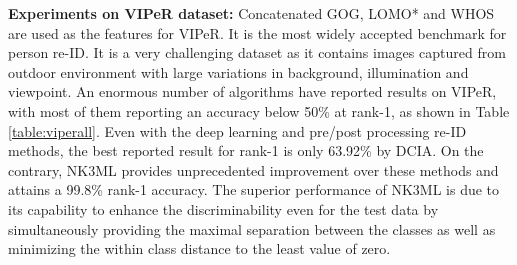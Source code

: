 \documentclass[runningheads]{llncs}
\begin{document}
\setlength{\parskip}{1.5mm}
\noindent \textbf{Experiments on VIPeR dataset:}
Concatenated GOG, LOMO* and WHOS are used as the features for VIPeR. It is the most widely accepted benchmark for person re-ID. It is a very challenging dataset as it contains images captured from outdoor environment with large variations in background, illumination and viewpoint. An enormous number of algorithms have reported results on VIPeR, with most of them reporting an accuracy below 50\% at rank-1, as shown in Table \ref{table:viperall}. Even with the deep learning and pre/post processing re-ID methods, the best reported result for rank-1 is only 63.92\% by DCIA\cite{DCIA}. On the contrary, NK3ML provides unprecedented improvement over these methods and attains a 99.8\% rank-1 accuracy.
The superior performance of NK3ML is due to its capability to enhance the discriminability  even for the test data by simultaneously providing the maximal separation between the classes as well as minimizing the within class distance to the least value of zero. 
\setlength{\parskip}{0mm}
\end{document}
